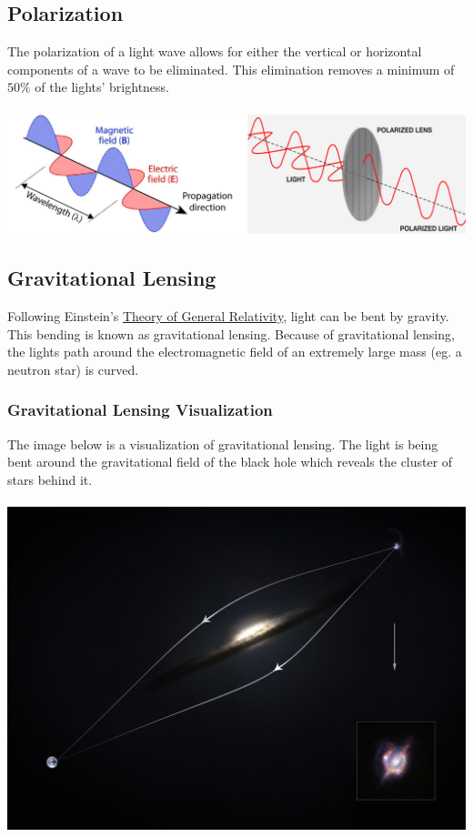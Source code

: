 \documentclass{article}
\begin{document}
\subsection{Polarization}
The polarization of a light wave allows for either the vertical or horizontal components of a wave to be eliminated. This elimination removes a minimum of $50\%$ of the lights' brightness.\\\\
\includegraphics[scale=0.45]{images/polarization.png}
\subsection{Gravitational Lensing}\label{sec:gravitational_lensing}
Following Einstein's \hyperref[sec:generalrelativity]{Theory of General Relativity}, light can be bent by gravity. This bending is known as gravitational lensing. Because of gravitational lensing, the lights path around the electromagnetic field of an extremely large mass (eg. a neutron star) is curved.

\subsubsection{Gravitational Lensing Visualization}
The image below is a visualization of gravitational lensing. The light is being bent around the gravitational field of the black hole which reveals the cluster of stars behind it.\\\\
\includegraphics[scale=0.2]{images/grav_lensing.png}
\end{document}
